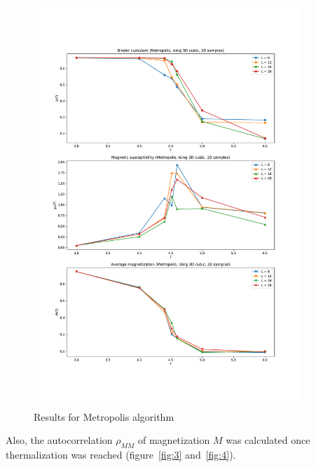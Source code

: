 \documentclass[11pt,a4paper]{article}
\begin{document}
\begin{figure}[b]
	\includegraphics[width=0.9\textwidth]{Metropolis.pdf}
	\caption[short]{Results for Metropolis algorithm}
	\label{fig:2}
\end{figure}

Also, the autocorrelation $\rho_{MM}$ of magnetization $M$ was calculated once
thermalization was reached (figure~\ref{fig:3} and~\ref{fig:4}).
\end{document}
